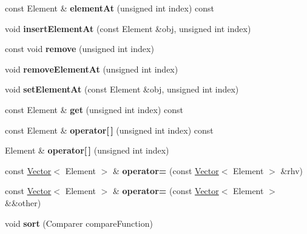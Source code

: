 \begin{DoxyCompactItemize}
\item 
\hypertarget{class_vector_a236b18bdd8f89ba1add3088be47019ef}{}const Element \& {\bfseries element\+At} (unsigned int index) const \label{class_vector_a236b18bdd8f89ba1add3088be47019ef}

\item 
\hypertarget{class_vector_ad344634c438be8dfbfd39d4e4554309b}{}void {\bfseries insert\+Element\+At} (const Element \&obj, unsigned int index)\label{class_vector_ad344634c438be8dfbfd39d4e4554309b}

\item 
\hypertarget{class_vector_a11580815fd71a8a8bf61f4fe33248113}{}const void {\bfseries remove} (unsigned int index)\label{class_vector_a11580815fd71a8a8bf61f4fe33248113}

\item 
\hypertarget{class_vector_abd89a406d6debba20a83c9d717c659e3}{}void {\bfseries remove\+Element\+At} (unsigned int index)\label{class_vector_abd89a406d6debba20a83c9d717c659e3}

\item 
\hypertarget{class_vector_a1a0b352c1ffe22850d4dad862ffc369a}{}void {\bfseries set\+Element\+At} (const Element \&obj, unsigned int index)\label{class_vector_a1a0b352c1ffe22850d4dad862ffc369a}

\item 
\hypertarget{class_vector_a224626445184bbb1051b37a052a9ce27}{}const Element \& {\bfseries get} (unsigned int index) const \label{class_vector_a224626445184bbb1051b37a052a9ce27}

\item 
\hypertarget{class_vector_a98f09e3c0a53a6111bb4a9a08ce31eed}{}const Element \& {\bfseries operator\mbox{[}$\,$\mbox{]}} (unsigned int index) const \label{class_vector_a98f09e3c0a53a6111bb4a9a08ce31eed}

\item 
\hypertarget{class_vector_a343a4dd499a4f53476eb8f1c03b91275}{}Element \& {\bfseries operator\mbox{[}$\,$\mbox{]}} (unsigned int index)\label{class_vector_a343a4dd499a4f53476eb8f1c03b91275}

\item 
\hypertarget{class_vector_a3012cf49bead2546652bc1d2b7757d13}{}const \hyperlink{class_vector}{Vector}$<$ Element $>$ \& {\bfseries operator=} (const \hyperlink{class_vector}{Vector}$<$ Element $>$ \&rhv)\label{class_vector_a3012cf49bead2546652bc1d2b7757d13}

\item 
\hypertarget{class_vector_a0a6c64c2a3e35e08366b6b55d5f047ce}{}const \hyperlink{class_vector}{Vector}$<$ Element $>$ \& {\bfseries operator=} (const \hyperlink{class_vector}{Vector}$<$ Element $>$ \&\&other)\label{class_vector_a0a6c64c2a3e35e08366b6b55d5f047ce}

\item 
\hypertarget{class_vector_a9844becce994d438a71559d09d6f58d6}{}void {\bfseries sort} (Comparer compare\+Function)\label{class_vector_a9844becce994d438a71559d09d6f58d6}

\end{DoxyCompactItemize}
